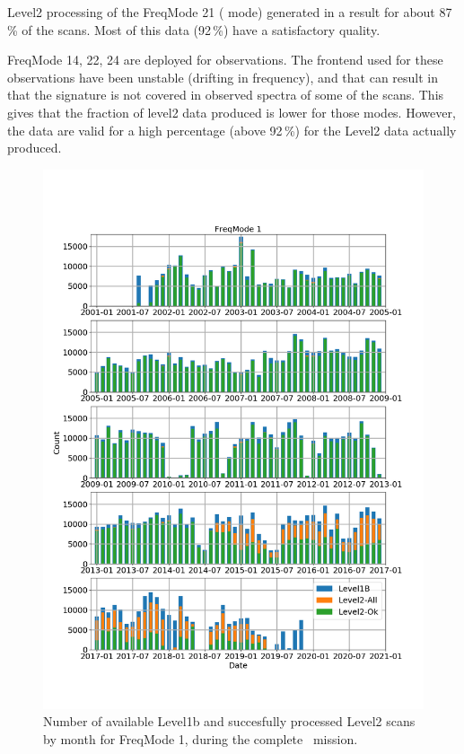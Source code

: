 Level2 processing of the FreqMode 21 ( mode)
generated in a result for about 87\,\% of the scans.
Most of this data (92\,\%) have a satisfactory quality.

FreqMode 14, 22, 24 are deployed for  observations.
The frontend used for these observations have been unstable
(drifting in frequency), and that can result in that the 
 signature is not covered in observed spectra 
of some of the scans. This gives that the fraction of
level2 data produced is lower for those modes.
However, the data are valid for a high percentage
(above 92\,\%) for the Level2 data actually produced.  
 

\begin{figure}[t]
\centering
\includegraphics[width=1.0\textwidth]{l2cad-fm1.png}
\caption{Number of available Level1b and succesfully processed Level2
scans by month for FreqMode 1, during the complete \smr\ mission.}
\label{fig:l2cad-fm1}
\end{figure}

